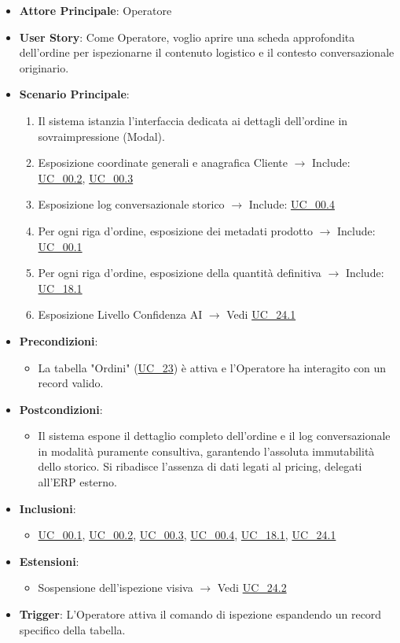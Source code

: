 \begin{itemize}
    \item \textbf{Attore Principale}: Operatore
    \item \textbf{User Story}: Come Operatore, voglio aprire una scheda approfondita dell'ordine per ispezionarne il contenuto logistico e il contesto conversazionale originario.
    \item \textbf{Scenario Principale}: 
    \begin{enumerate}
        \item Il sistema istanzia l'interfaccia dedicata ai dettagli dell'ordine in sovraimpressione (Modal).
        \item Esposizione coordinate generali e anagrafica Cliente $\rightarrow$ Include: \hyperref[uc_00.2]{UC\_00.2}, \hyperref[uc_00.3]{UC\_00.3}
        \item Esposizione log conversazionale storico $\rightarrow$ Include: \hyperref[uc_00.4]{UC\_00.4}
        \item Per ogni riga d'ordine, esposizione dei metadati prodotto $\rightarrow$ Include: \hyperref[uc_00.1]{UC\_00.1}
        \item Per ogni riga d'ordine, esposizione della quantità definitiva $\rightarrow$ Include: \hyperref[uc_18.1]{UC\_18.1}
        \item Esposizione Livello Confidenza AI $\rightarrow$ Vedi \hyperref[uc_24.1]{UC\_24.1}
    \end{enumerate}
    \item \textbf{Precondizioni}:
    \begin{itemize}
        \item La tabella "Ordini" (\hyperref[uc_23]{UC\_23}) è attiva e l'Operatore ha interagito con un record valido.
    \end{itemize}
    \item \textbf{Postcondizioni}:
    \begin{itemize}
        \item Il sistema espone il dettaglio completo dell'ordine e il log conversazionale in modalità puramente consultiva, garantendo l'assoluta immutabilità dello storico. Si ribadisce l'assenza di dati legati al pricing, delegati all'ERP esterno.
    \end{itemize}
    \item \textbf{Inclusioni}:
    \begin{itemize}
        \item \hyperref[uc_00.1]{UC\_00.1}, \hyperref[uc_00.2]{UC\_00.2}, \hyperref[uc_00.3]{UC\_00.3}, \hyperref[uc_00.4]{UC\_00.4}, \hyperref[uc_18.1]{UC\_18.1}, \hyperref[uc_24.1]{UC\_24.1}
    \end{itemize}
    \item \textbf{Estensioni}:
    \begin{itemize}
        \item Sospensione dell'ispezione visiva $\rightarrow$ Vedi \hyperref[uc_24.2]{UC\_24.2}
    \end{itemize}
    \item \textbf{Trigger}: L'Operatore attiva il comando di ispezione espandendo un record specifico della tabella.
\end{itemize}

